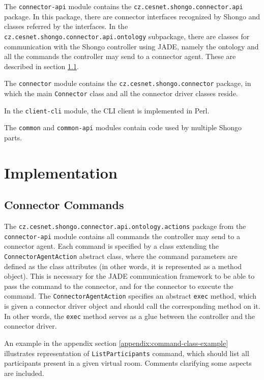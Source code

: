 The \texttt{connector-api} module contains the \texttt{cz.cesnet.shongo.connector.api} package. In this package, there are connector interfaces recognized by Shongo and classes referred by the interfaces. In the \texttt{cz.cesnet.shongo.connector.api.ontology} subpackage, there are classes for communication with the Shongo controller using JADE, namely the ontology and all the commands the controller may send to a connector agent. These are described in section \ref{connector-commands}.

The \texttt{connector} module contains the \texttt{cz.cesnet.shongo.connector} package, in which the main \texttt{Connector} class and all the connector driver classes reside.

In the \texttt{client-cli} module, the CLI client is implemented in Perl.

The \texttt{common} and \texttt{common-api} modules contain code used by multiple Shongo parts.



\chapter{Implementation}


\section{Connector Commands} \label{connector-commands}

The \texttt{cz.cesnet.shongo.connector.api.ontology.actions} package from the \texttt{connector-api} module contains all commands the controller may send to a connector agent. Each command is specified by a class extending the \texttt{ConnectorAgentAction} abstract class, where the command parameters are defined as the class attributes (in other words, it is represented as a method object). This is necessary for the JADE communication framework to be able to pass the command to the connector, and for the connector to execute the command. The \texttt{ConnectorAgentAction} specifies an abstract \texttt{exec} method, which is given a connector driver object and should call the corresponding method on it. In other words, the \texttt{exec} method serves as a glue between the controller and the connector driver.

An example in the appendix section \ref{appendix:command-class-example} illustrates representation of \texttt{ListParticipants} command, which should list all participants present in a given virtual room. Comments clarifying some aspects are included.


